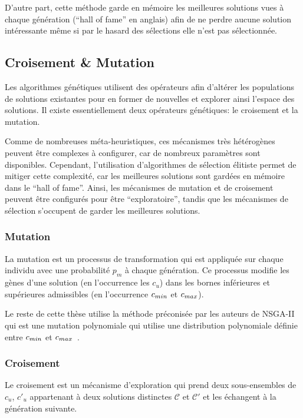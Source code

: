 D'autre part, cette méthode garde en mémoire les meilleures solutions vues à chaque génération (``hall of fame'' en anglais) afin de ne perdre aucune solution intéressante même si par le hasard des sélections elle n'est pas sélectionnée.

\subsection{Croisement \& Mutation}
\label{cache:mutation}

Les algorithmes génétiques utilisent des opérateurs afin d'altérer les populations de solutions existantes pour en former de nouvelles et explorer ainsi l'espace des solutions.
Il existe essentiellement deux opérateurs génétiques: le croisement et la mutation.

Comme de nombreuses méta-heuristiques, ces mécanismes très hétérogènes peuvent être complexes à configurer, car de nombreux paramètres sont disponibles.
Cependant, l'utilisation d'algorithmes de sélection élitiste permet de mitiger cette complexité, car les meilleures solutions sont gardées en mémoire dans le ``hall of fame''.
Ainsi, les mécanismes de mutation et de croisement peuvent être configurés pour être  ``exploratoire'', tandis que les mécanismes de sélection s'occupent de garder les meilleures solutions.

\subsubsection{Mutation}

La mutation est un processus de transformation qui est appliquée sur chaque individu avec une probabilité $p_m$ à chaque génération.
Ce processus modifie les gènes d'une solution (en l’occurrence les $c_u$) dans les bornes inférieures et supérieures admissibles (en l’occurrence $c_{min}$ et $c_{max}$).

Le reste de cette thèse utilise la méthode préconisée par les auteurs de NSGA-II qui est une mutation polynomiale qui utilise une distribution polynomiale définie entre $c_{min}$ et $c_{max}$~\cite{deb2014analysing}.

\subsubsection{Croisement}

Le croisement est un mécanisme d'exploration qui prend deux sous-ensembles de $c_u$, $c'_u$ appartenant à deux solutions distinctes $\mathcal{C}$ et $\mathcal{C}'$ et les échangent à la génération suivante.

